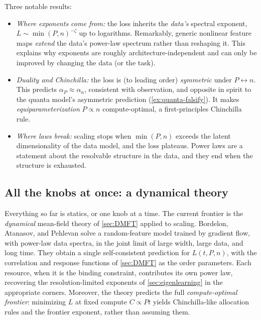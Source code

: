 \documentclass[11pt]{article}
\begin{document}
Three notable results:
%
\begin{itemize}
    \item \emph{Where exponents come from:} the loss inherits the \emph{data's} spectral exponent, $L \sim \min(P,n)^{-\zeta}$ up to logarithms. Remarkably, generic nonlinear feature maps \emph{extend} the data's power-law spectrum rather than reshaping it. This explains why exponents are roughly architecture-independent and can only be improved by changing the data (or the task).
    \item \emph{Duality and Chinchilla:} the loss is (to leading order) \emph{symmetric} under $P\leftrightarrow n$. This predicts $\alpha_P \approx \alpha_n$, consistent with observation, and opposite in spirit to the quanta model's asymmetric prediction (\cref{ex:quanta-falsify}). It makes \emph{equiparameterization} $P\propto n$ compute-optimal, a first-principles Chinchilla rule.
    \item \emph{Where laws break:} scaling stops when $\min(P,n)$ exceeds the latent dimensionality of the data model, and the loss plateaus. Power laws are a statement about the resolvable structure in the data, and they end when the structure is exhausted.
\end{itemize}

\subsection{All the knobs at once: a dynamical theory}
\label{sec:scaling-dmft}

Everything so far is statics, or one knob at a time. The current frontier is the \emph{dynamical} mean-field theory of \cref{sec:DMFT} applied to scaling. Bordelon, Atanasov, and Pehlevan \cite{bordelon2024dynamical} solve a random-feature model trained by gradient flow, with power-law data spectra, in the joint limit of large width, large data, and long time. They obtain a single self-consistent prediction for $L(t, P, n)$, with the correlation and response functions of \cref{sec:DMFT} as the order parameters. Each resource, when it is the binding constraint, contributes its own power law, recovering the resolution-limited exponents of \cref{sec:eigenlearning} in the appropriate corners. Moreover, the theory predicts the full \emph{compute-optimal frontier}: minimizing $L$ at fixed compute $C \propto P t$ yields Chinchilla-like allocation rules and the frontier exponent, rather than assuming them.
\end{document}
